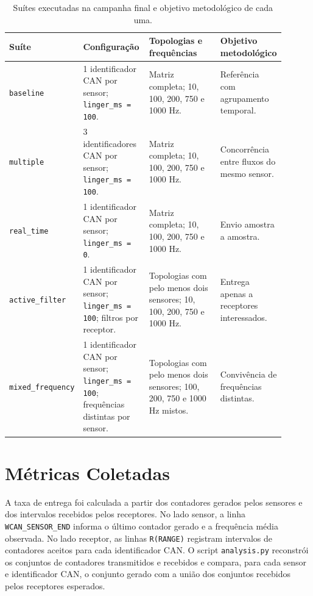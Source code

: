 \begin{table}[htbp]
\centering
\scriptsize
\setlength{\tabcolsep}{3pt}
\renewcommand{\arraystretch}{1.16}
\begin{tabular}{p{0.17\linewidth}|p{0.24\linewidth}|p{0.27\linewidth}|p{0.22\linewidth}}
\hline
Suíte & Configuração & Topologias e frequências & Objetivo metodológico \\
\hline
\texttt{baseline} & 1 identificador CAN por sensor; \texttt{linger\_ms = 100}. & Matriz completa; 10, 100, 200, 750 e 1000 Hz. & Referência com agrupamento temporal. \\
\hline
\texttt{multiple} & 3 identificadores CAN por sensor; \texttt{linger\_ms = 100}. & Matriz completa; 10, 100, 200, 750 e 1000 Hz. & Concorrência entre fluxos do mesmo sensor. \\
\hline
\texttt{real\_time} & 1 identificador CAN por sensor; \texttt{linger\_ms = 0}. & Matriz completa; 10, 100, 200, 750 e 1000 Hz. & Envio amostra a amostra. \\
\hline
\texttt{active\_filter} & 1 identificador CAN por sensor; \texttt{linger\_ms = 100}; filtros por receptor. & Topologias com pelo menos dois sensores; 10, 100, 200, 750 e 1000 Hz. & Entrega apenas a receptores interessados. \\
\hline
\texttt{mixed\_frequency} & 1 identificador CAN por sensor; \texttt{linger\_ms = 100}; frequências distintas por sensor. & Topologias com pelo menos dois sensores; 100, 200, 750 e 1000 Hz mistos. & Convivência de frequências distintas. \\
\hline
\end{tabular}
\caption{Suítes executadas na campanha final e objetivo metodológico de cada uma.}
\label{tab:suites-executadas}
\end{table}

\section{Métricas Coletadas}

A taxa de entrega foi calculada a partir dos contadores gerados pelos sensores e dos intervalos recebidos pelos receptores. No lado sensor, a linha \texttt{WCAN\_SENSOR\_END} informa o último contador gerado e a frequência média observada. No lado receptor, as linhas \texttt{R(RANGE)} registram intervalos de contadores aceitos para cada identificador CAN. O script \texttt{analysis.py} reconstrói os conjuntos de contadores transmitidos e recebidos e compara, para cada sensor e identificador CAN, o conjunto gerado com a união dos conjuntos recebidos pelos receptores esperados.


